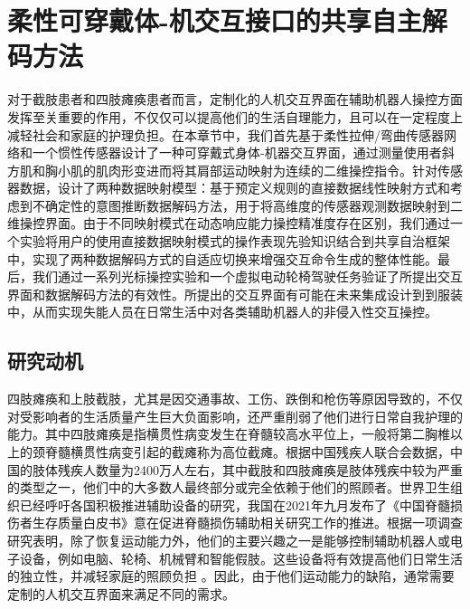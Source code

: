 \chapter{柔性可穿戴体-机交互接口的共享自主解码方法}

对于截肢患者和四肢瘫痪患者而言，定制化的人机交互界面在辅助机器人操控方面发挥至关重要的作用，不仅仅可以提高他们的生活自理能力，且可以在一定程度上减轻社会和家庭的护理负担。在本章节中，我们首先基于柔性拉伸/弯曲传感器网络和一个惯性传感器设计了一种可穿戴式身体-机器交互界面，通过测量使用者斜方肌和胸小肌的肌肉形变进而将其肩部运动映射为连续的二维操控指令。针对传感器数据，设计了两种数据映射模型：基于预定义规则的直接数据线性映射方式和考虑到不确定性的意图推断数据解码方法，用于将高维度的传感器观测数据映射到二维操控界面。由于不同映射模式在动态响应能力操控精准度存在区别，我们通过一个实验将用户的使用直接数据映射模式的操作表现先验知识结合到共享自治框架中，实现了两种数据解码方式的自适应切换来增强交互命令生成的整体性能。最后，我们通过一系列光标操控实验和一个虚拟电动轮椅驾驶任务验证了所提出交互界面和数据解码方法的有效性。所提出的交互界面有可能在未来集成设计到到服装中，从而实现失能人员在日常生活中对各类辅助机器人的非侵入性交互操控。

\section{研究动机}    
四肢瘫痪和上肢截肢，尤其是因交通事故、工伤、跌倒和枪伤等原因导致的，不仅对受影响者的生活质量产生巨大负面影响，还严重削弱了他们进行日常自我护理的能力。其中四肢瘫痪是指横贯性病变发生在脊髓较高水平位上，一般将第二胸椎以上的颈脊髓横贯性病变引起的截瘫称为高位截瘫。根据中国残疾人联合会数据，中国的肢体残疾人数量为2400万人左右\cite{ZhongGuoCanJiRenFuLiJiJinHuiHuoJuan600WanYuanBangFuPinKunZhiCanRenShi_GunDongXinWen_ZhongGuoZhengFuWang}，其中截肢和四肢瘫痪是肢体残疾中较为严重的类型之一，他们中的大多数人最终部分或完全依赖于他们的照顾者\cite{vitorinodinizRachimeduralTraumaEpidemiology2016}。世界卫生组织已经呼吁各国积极推进辅助设备的研究，我国在2021年九月发布了《中国脊髓损伤者生存质量白皮书》意在促进脊髓损伤辅助相关研究工作的推进。根据一项调查研究表明，除了恢复运动能力外，他们的主要兴趣之一是能够控制辅助机器人或电子设备，例如电脑、轮椅、机械臂和智能假肢。这些设备将有效提高他们日常生活的独立性，并减轻家庭的照顾负担    \cite{orejuela-zapataSelfHelpDevicesQuadriplegic2019}。因此，由于他们运动能力的缺陷，通常需要定制的人机交互界面来满足不同的需求。  


